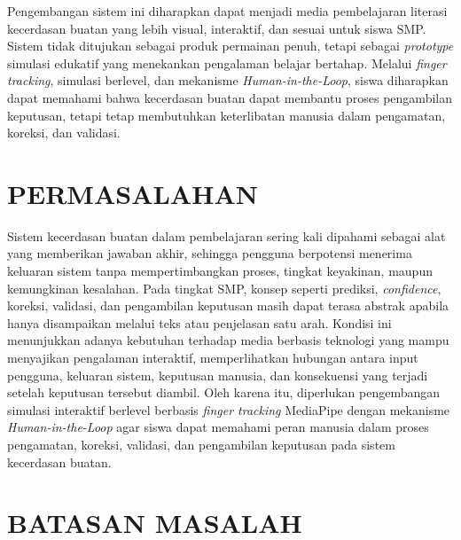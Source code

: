 \documentclass[12pt,a4paper,oneside,openany]{report}
\begin{document}
Pengembangan sistem ini diharapkan dapat menjadi media pembelajaran literasi kecerdasan buatan yang lebih visual, interaktif, dan sesuai untuk siswa SMP. Sistem tidak ditujukan sebagai produk permainan penuh, tetapi sebagai \textit{prototype} simulasi edukatif yang menekankan pengalaman belajar bertahap. Melalui \textit{finger tracking}, simulasi berlevel, dan mekanisme \textit{Human-in-the-Loop}, siswa diharapkan dapat memahami bahwa kecerdasan buatan dapat membantu proses pengambilan keputusan, tetapi tetap membutuhkan keterlibatan manusia dalam pengamatan, koreksi, dan validasi.

\section{PERMASALAHAN}
\label{sec:permasalahan}

Sistem kecerdasan buatan dalam pembelajaran sering kali dipahami sebagai alat yang memberikan jawaban akhir, sehingga pengguna berpotensi menerima keluaran sistem tanpa mempertimbangkan proses, tingkat keyakinan, maupun kemungkinan kesalahan. Pada tingkat SMP, konsep seperti prediksi, \textit{confidence}, koreksi, validasi, dan pengambilan keputusan masih dapat terasa abstrak apabila hanya disampaikan melalui teks atau penjelasan satu arah. Kondisi ini menunjukkan adanya kebutuhan terhadap media berbasis teknologi yang mampu menyajikan pengalaman interaktif, memperlihatkan hubungan antara input pengguna, keluaran sistem, keputusan manusia, dan konsekuensi yang terjadi setelah keputusan tersebut diambil. Oleh karena itu, diperlukan pengembangan simulasi interaktif berlevel berbasis \textit{finger tracking} MediaPipe dengan mekanisme \textit{Human-in-the-Loop} agar siswa dapat memahami peran manusia dalam proses pengamatan, koreksi, validasi, dan pengambilan keputusan pada sistem kecerdasan buatan.

\section{BATASAN MASALAH}
\label{sec:batasan-masalah}
\end{document}
